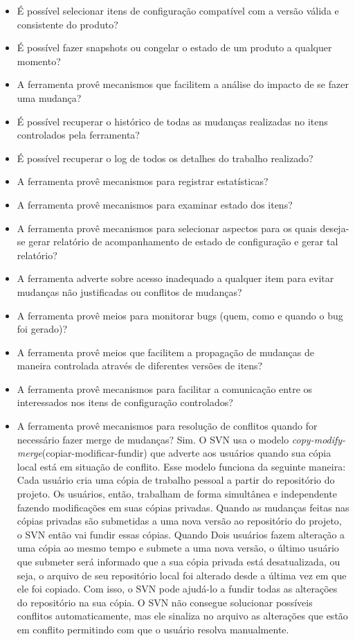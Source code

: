 \begin{itemize}
  
  \item É possível selecionar itens de configuração compatível com a versão válida e consistente do
  produto?
  \item É possível fazer snapshots ou congelar o estado de um produto a qualquer momento?
  \item A ferramenta provê mecanismos que facilitem a análise do impacto de se fazer uma mudança?
  \item É possível recuperar o histórico de todas as mudanças realizadas no itens controlados pela
  ferramenta?
  \item É possível recuperar o log de todos os detalhes do trabalho realizado?
  \item A ferramenta provê mecanismos para registrar estatísticas?
  \item A ferramenta provê mecanismos para examinar estado dos itens?
  \item A ferramenta provê mecanismos para selecionar aspectos para os quais deseja-se gerar relatório
  de acompanhamento de estado de configuração e gerar tal relatório?
  \item A ferramenta adverte sobre acesso inadequado a qualquer item para evitar mudanças não justificadas
  ou conflitos de mudanças?
  \item A ferramenta provê meios para monitorar bugs (quem, como e quando o bug foi gerado)?
  \item A ferramenta provê meios que facilitem a propagação de mudanças de maneira controlada
  através de diferentes versões de itens?
  \item A ferramenta provê mecanismos para facilitar a comunicação entre os interessados nos itens de
  configuração controlados?
  \item A ferramenta provê mecanismos para resolução de conflitos quando for necessário fazer merge
  de mudanças?
  Sim. O SVN usa o modelo \textit{copy-modify-merge}(copiar-modificar-fundir) que adverte aos usuários quando sua cópia local está em situação de conflito.
  Esse modelo funciona da seguinte maneira: 
  Cada usuário cria uma cópia de trabalho pessoal a partir do repositório do projeto. Os usuários, então, 
  trabalham de forma simultânea e independente fazendo modificações em suas cópias privadas. Quando as mudanças 
  feitas nas cópias privadas são submetidas a uma nova versão ao repositório do projeto, o SVN então vai fundir essas cópias.
  Quando Dois usuários fazem alteração a uma cópia ao mesmo tempo e submete a uma nova versão, o último usuário que submeter será informado
  que a sua cópia privada está desatualizada, ou seja, o arquivo de seu repositório local foi alterado desde a 
  última vez em que ele foi copiado. Com isso, o SVN pode ajudá-lo a fundir todas as alterações do repositório na sua cópia. 
  O SVN não consegue solucionar possíveis conflitos automaticamente, mas ele sinaliza no arquivo as alterações que estão em conflito
   permitindo com que o usuário resolva manualmente.
\end{itemize}
